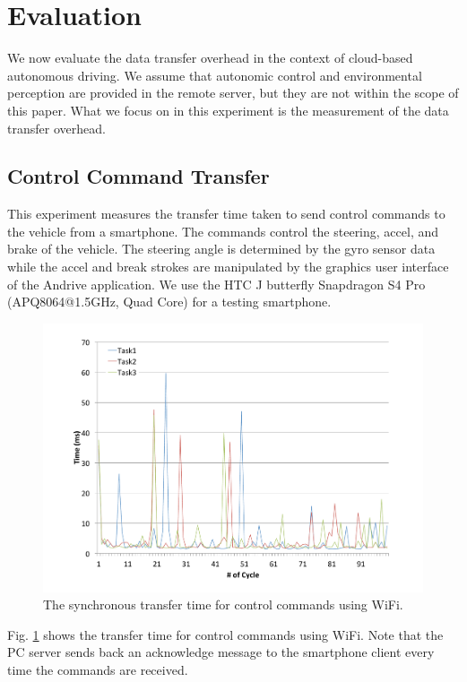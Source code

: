\section{Evaluation}
\label{sec:evaluation}

We now evaluate the data transfer overhead in the context of cloud-based
autonomous driving.
We assume that autonomic control and environmental perception are
provided in the remote server, but they are not within the scope of this
paper.
What we focus on in this experiment is the measurement of the data
transfer overhead.

\subsection{Control Command Transfer}

This experiment measures the transfer time taken to send control
commands to the vehicle from a smartphone.
The commands control the steering, accel, and brake of the vehicle.
The steering angle is determined by the gyro sensor data while the accel
and break strokes are manipulated by the graphics user interface of the
Andrive application.
We use the HTC J butterfly Snapdragon S4 Pro (APQ8064@1.5GHz, Quad Core)
for a testing smartphone.

\begin{figure}[!t]
 \centering
 \includegraphics[width=\hsize]{fig/No1_Andrive_serv_cycle_WiFi.pdf}
 \caption{The synchronous transfer time for control commands using WiFi.}
 \label{fig:no1}
\end{figure}

Fig. \ref{fig:no1} shows the transfer time for control commands using
WiFi.
Note that the PC server sends back an acknowledge message to the
smartphone client every time the commands are received.

